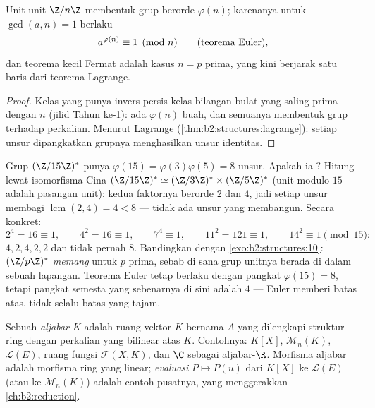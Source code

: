 \begin{theorem}\label{thm:b2:structures:euler}
Unit-unit $\Z/n\Z$ membentuk grup berorde $\varphi(n)$; karenanya untuk
$\gcd(a, n) = 1$ berlaku
\[
a^{\varphi(n)} \equiv 1 \pmod n
\qquad (\text{teorema Euler\index{teorema Euler}}),
\]
dan teorema kecil Fermat adalah kasus $n = p$ prima, yang kini berjarak
satu baris dari teorema Lagrange.
\end{theorem}

\begin{proof}
Kelas yang punya invers persis kelas bilangan bulat yang saling prima
dengan $n$ (jilid Tahun ke-1): ada $\varphi(n)$ buah, dan semuanya
membentuk grup terhadap perkalian. Menurut Lagrange
(\cref{thm:b2:structures:lagrange}): setiap unsur dipangkatkan 
grupnya menghasilkan unsur identitas.
\end{proof}

\begin{example}\label{ex:b2:structures:units15}
Grup $(\Z/15\Z)^*$ punya $\varphi(15) = \varphi(3)\varphi(5)
= 8$ unsur. Apakah ia ? Hitung  lewat isomorfisma
Cina $(\Z/15\Z)^* \simeq (\Z/3\Z)^* \times (\Z/5\Z)^*$
(unit modulo $15$ adalah pasangan unit): kedua faktornya berorde
$2$ dan $4$, jadi  setiap unsur membagi
$\operatorname{lcm}(2, 4) = 4 < 8$ --- tidak ada unsur yang membangun.
Secara konkret:
\[
2^4 = 16 \equiv 1, \qquad
4^2 = 16 \equiv 1, \qquad
7^4 \equiv 1, \qquad
11^2 = 121 \equiv 1, \qquad
14^2 \equiv 1 \pmod{15} :
\]
 $4, 2, 4, 2, 2$ dan tidak pernah $8$. Bandingkan dengan
\cref{exo:b2:structures:10}: $(\Z/p\Z)^*$ \emph{memang}  untuk
$p$ prima, sebab di sana grup unitnya berada di dalam sebuah lapangan.
Teorema Euler tetap berlaku dengan pangkat $\varphi(15) = 8$,
tetapi pangkat semesta yang sebenarnya di sini adalah $4$ --- Euler
memberi batas atas, tidak selalu batas yang tajam.
\end{example}

\begin{definition}[Aljabar]\label{def:b2:structures:algebra}
Sebuah \emph{aljabar-$K$} adalah ruang vektor $K$ bernama
$A$ yang dilengkapi struktur ring dengan perkalian yang bilinear atas
$K$. Contohnya: $K[X]$, $\mathcal{M}_n(K)$, $\mathcal{L}(E)$, ruang
fungsi $\mathcal{F}(X, K)$, dan $\C$ sebagai aljabar-$\R$. Morfisma
aljabar adalah morfisma ring yang linear; \emph{evaluasi} $P \mapsto P(u)$
dari $K[X]$ ke $\mathcal{L}(E)$ (atau ke $\mathcal{M}_n(K)$) adalah
contoh pusatnya, yang menggerakkan \cref{ch:b2:reduction}.
\end{definition}

